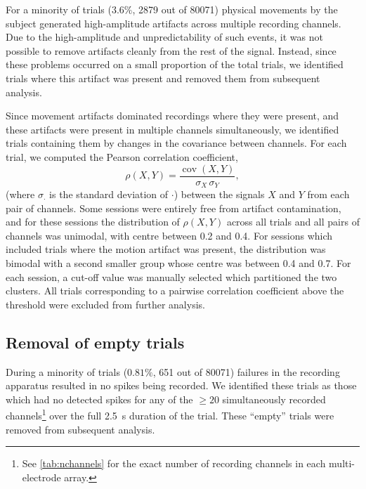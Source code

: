 For a minority of trials ($3.6\%$, \num{2879} out of \num{80071}) physical movements by the subject generated high-amplitude artifacts across multiple recording channels.
Due to the high-amplitude and unpredictability of such events, it was not possible to remove artifacts cleanly from the rest of the signal.
Instead, since these problems occurred on a small proportion of the total trials, we identified trials where this artifact was present and removed them from subsequent analysis.

Since movement artifacts dominated recordings where they were present, and these artifacts were present in multiple channels simultaneously, we identified trials containing them by changes in the covariance between channels.
For each trial, we computed the Pearson correlation coefficient,
\begin{equation}
\label{eq:pearson}
\rho(X,Y) = \frac{\operatorname{cov}(X,Y)}{\sigma_X \, \sigma_Y}
,\end{equation}
(where $\sigma_\cdot$ is the standard deviation of $\cdot$) between the signals $X$ and $Y$ from each pair of channels.
Some sessions were entirely free from artifact contamination, and for these sessions the distribution of $\rho(X,Y)$ across all trials and all pairs of channels was unimodal, with centre between \num{0.2} and \num{0.4}.
For sessions which included trials where the motion artifact was present, the distribution was bimodal with a second smaller group whose centre was between \num{0.4} and \num{0.7}.
For each session, a cut-off value was manually selected which partitioned the two clusters.
All trials corresponding to a pairwise correlation coefficient above the threshold were excluded from further analysis.



\subsection{Removal of empty trials}
\label{sec:pl_empty_trials}

During a minority of trials ($0.81\%$, \num{651} out of \num{80071}) failures in the recording apparatus resulted in no spikes being recorded.
We identified these trials as those which had no detected spikes for any of the ${\ge}20$ simultaneously recorded channels\footnote{See \autoref{tab:nchannels} for the exact number of recording channels in each multi-electrode array.} over the full \SI{2.5}{\second} duration of the trial.
These ``empty'' trials were removed from subsequent analysis.


